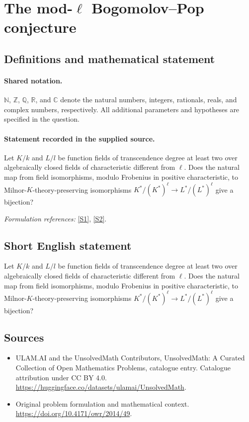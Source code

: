 \documentclass[11pt]{article}
\newcommand{\sref}[2]{\hyperlink{source:#1:#2}{[S#2]}}
\begin{document}
\section{\texorpdfstring{The mod-$\ell$ Bogomolov–Pop conjecture}{The mod-ell Bogomolov–Pop conjecture}}\label{statement}

\subsection{Definitions and mathematical statement}

\paragraph{Shared notation.}$\mathbb N$, $\mathbb Z$, $\mathbb Q$, $\mathbb R$, and $\mathbb C$ denote the natural numbers, integers, rationals, reals, and complex numbers, respectively. All additional parameters and hypotheses are specified in the question.


\paragraph{Statement recorded in the supplied source.}
Let $K/k$ and $L/l$ be function fields of transcendence degree at least two over algebraically closed fields of characteristic different from $\ell$. Does the natural map from field isomorphisms, modulo Frobenius in positive characteristic, to Milnor-$K$-theory-preserving isomorphisms $K^*/(K^*)^\ell\to L^*/(L^*)^\ell$ give a bijection?
\par\smallskip\textit{Formulation references:} \sref{statement}{1}, \sref{statement}{2}.
\subsection{Short English statement}
Let $K/k$ and $L/l$ be function fields of transcendence degree at least two over algebraically closed fields of characteristic different from $\ell$. Does the natural map from field isomorphisms, modulo Frobenius in positive characteristic, to Milnor-$K$-theory-preserving isomorphisms $K^*/(K^*)^\ell\to L^*/(L^*)^\ell$ give a bijection?
\subsection{Sources}
\begin{itemize}
\item[\hypertarget{source:statement:1}{S1}] ULAM.AI and the UnsolvedMath Contributors, UnsolvedMath: A Curated Collection of Open Mathematics Problems, catalogue entry. Catalogue attribution under CC BY 4.0.
\url{https://huggingface.co/datasets/ulamai/UnsolvedMath}.
\item[\hypertarget{source:statement:2}{S2}] Original problem formulation and mathematical context.
\url{https://doi.org/10.4171/owr/2014/49}.
\end{itemize}
\label{end:statement}
\end{document}
